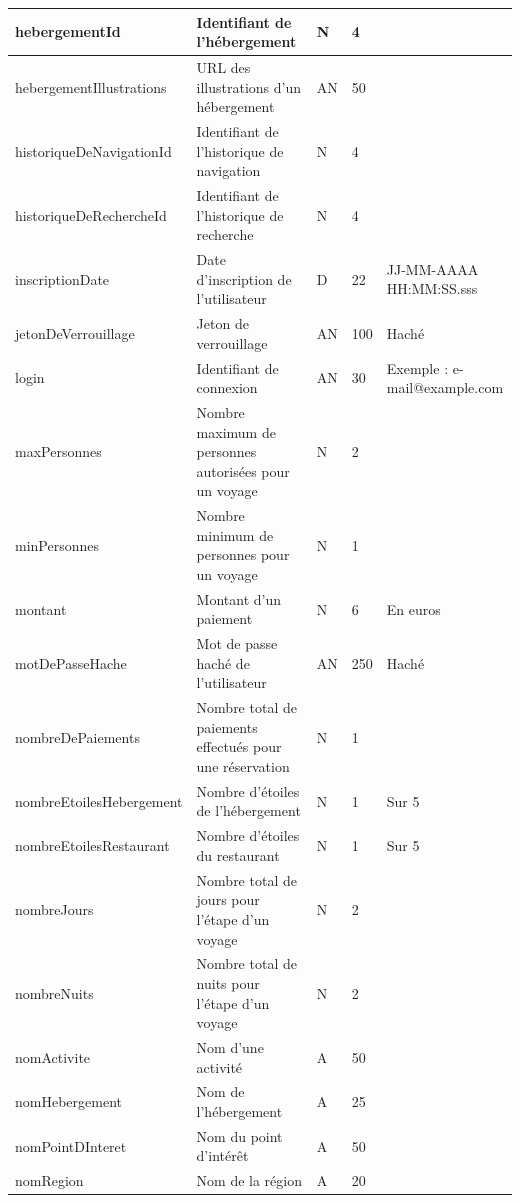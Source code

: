 \documentclass[12pt]{report}
\begin{document}
\begin{longtable}{|p{4cm}|p{4cm}|p{1cm}|p{1cm}|p{4cm}|}
				\hline
				hebergementId & Identifiant de l'hébergement & N & 4 & \\						
				\hline
				hebergementIllustrations & URL des illustrations d'un hébergement & AN & 50 & \\						
				\hline
				historiqueDeNavigationId & Identifiant de l'historique de navigation & N & 4 & \\						
				\hline
				historiqueDeRechercheId & Identifiant de l'historique de recherche & N & 4 & \\						
				\hline
				inscriptionDate & Date d'inscription de l'utilisateur & D & 22 & JJ-MM-AAAA HH:MM:SS.sss \\						
				\hline
				jetonDeVerrouillage & Jeton de verrouillage & AN & 100 & Haché \\						
				\hline
				login & Identifiant de connexion & AN & 30 & Exemple : e-mail@example.com \\						
				\hline
				maxPersonnes & Nombre maximum de personnes autorisées pour un voyage & N & 2 & \\						
				\hline
				minPersonnes & Nombre minimum de personnes pour un voyage & N & 1 & \\						
				\hline
				montant & Montant d'un paiement & N & 6 & En euros \\						
				\hline
				motDePasseHache & Mot de passe haché de l'utilisateur & AN & 250 & Haché \\						
				\hline
				nombreDePaiements & Nombre total de paiements effectués pour une réservation & N & 1 & \\						
				\hline
				nombreEtoilesHebergement & Nombre d'étoiles de l'hébergement & N & 1 & Sur 5 \\						
				\hline
				nombreEtoilesRestaurant & Nombre d'étoiles du restaurant & N & 1 & Sur 5 \\						
				\hline
				nombreJours & Nombre total de jours pour l'étape d'un voyage & N & 2 & \\						
				\hline
				nombreNuits & Nombre total de nuits pour l'étape d'un voyage & N & 2 & \\						
				\hline
				nomActivite & Nom d'une activité & A & 50 & \\						
				\hline
				nomHebergement & Nom de l'hébergement & A & 25 & \\						
				\hline
				nomPointDInteret & Nom du point d'intérêt & A & 50 & \\						
				\hline
				nomRegion & Nom de la région & A & 20 & \\						

\end{longtable}
\end{document}
